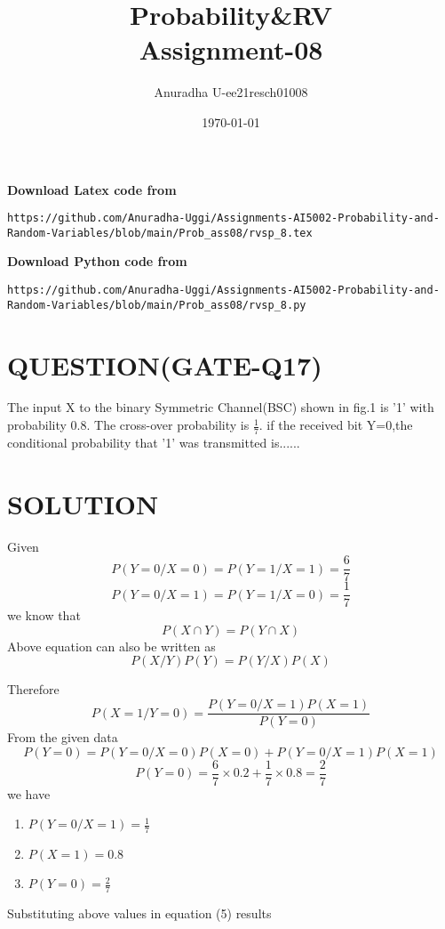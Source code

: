 \documentclass[journal,12pt,twocolumn]{IEEEtran}
\title{Probability\&RV \\ Assignment-08}
\author{Anuradha U-ee21resch01008}
\date{\today}
\begin{document}
\maketitle
\newpage
\bigskip
\renewcommand{\thefigure}{\theenumi}
\renewcommand{\thetable}{\theenumi}


\textbf{Download Latex code from}
\begin{lstlisting}
https://github.com/Anuradha-Uggi/Assignments-AI5002-Probability-and-Random-Variables/blob/main/Prob_ass08/rvsp_8.tex
\end{lstlisting}
\textbf{Download Python code from}
\begin{lstlisting}
https://github.com/Anuradha-Uggi/Assignments-AI5002-Probability-and-Random-Variables/blob/main/Prob_ass08/rvsp_8.py
\end{lstlisting}
\section{\textbf{QUESTION(GATE-Q17)}}
The input X to the binary Symmetric Channel(BSC) shown in fig.1 is '1' with probability 0.8. The cross-over probability is $\frac{1}{7}$. if the received bit Y=0,the conditional probability that '1' was transmitted is......

\section{\textbf{SOLUTION}}
Given 
\begin{equation}
    P(Y=0/X=0)=P(Y=1/X=1)= \frac{6}{7}
\end{equation}
\begin{equation}
    P(Y=0/X=1)=P(Y=1/X=0)=\frac{1}{7}
\end{equation}
we know that
\begin{equation}
    P(X\cap Y)=P(Y\cap X) 
\end{equation}
Above equation can also be written as
\begin{equation}
    P(X/Y)P(Y)=P(Y/X)P(X)
\end{equation}

Therefore
\begin{equation}
    P(X=1/Y=0)=\frac{P(Y=0/X=1)P(X=1)}{P(Y=0)}
\end{equation}
From the given data
\begin{equation}
    P(Y=0)=P(Y=0/X=0)P(X=0)+P(Y=0/X=1)P(X=1)
\end{equation}
\begin{equation}
    P(Y=0)= \frac{6}{7}\times 0.2+\frac{1}{7}\times 0.8=\frac{2}{7}
\end{equation}
we have
\begin{enumerate}
    \item $P(Y=0/X=1)=\frac{1}{7}$
    \item $P(X=1)=0.8$
    \item $P(Y=0)=\frac{2}{7}$
\end{enumerate}
Substituting above values in equation (5) results
\end{document}
